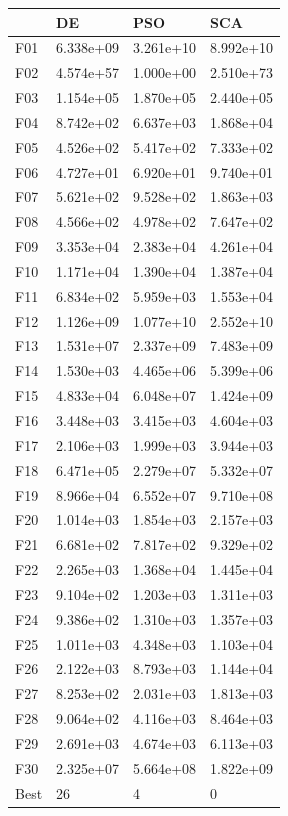 \begin{tabular}{llll}
\toprule
{} &         DE &        PSO &        SCA \\
\midrule
F01  &  6.338e+09 &  3.261e+10 &  8.992e+10 \\
F02  &  4.574e+57 &  1.000e+00 &  2.510e+73 \\
F03  &  1.154e+05 &  1.870e+05 &  2.440e+05 \\
F04  &  8.742e+02 &  6.637e+03 &  1.868e+04 \\
F05  &  4.526e+02 &  5.417e+02 &  7.333e+02 \\
F06  &  4.727e+01 &  6.920e+01 &  9.740e+01 \\
F07  &  5.621e+02 &  9.528e+02 &  1.863e+03 \\
F08  &  4.566e+02 &  4.978e+02 &  7.647e+02 \\
F09  &  3.353e+04 &  2.383e+04 &  4.261e+04 \\
F10  &  1.171e+04 &  1.390e+04 &  1.387e+04 \\
F11  &  6.834e+02 &  5.959e+03 &  1.553e+04 \\
F12  &  1.126e+09 &  1.077e+10 &  2.552e+10 \\
F13  &  1.531e+07 &  2.337e+09 &  7.483e+09 \\
F14  &  1.530e+03 &  4.465e+06 &  5.399e+06 \\
F15  &  4.833e+04 &  6.048e+07 &  1.424e+09 \\
F16  &  3.448e+03 &  3.415e+03 &  4.604e+03 \\
F17  &  2.106e+03 &  1.999e+03 &  3.944e+03 \\
F18  &  6.471e+05 &  2.279e+07 &  5.332e+07 \\
F19  &  8.966e+04 &  6.552e+07 &  9.710e+08 \\
F20  &  1.014e+03 &  1.854e+03 &  2.157e+03 \\
F21  &  6.681e+02 &  7.817e+02 &  9.329e+02 \\
F22  &  2.265e+03 &  1.368e+04 &  1.445e+04 \\
F23  &  9.104e+02 &  1.203e+03 &  1.311e+03 \\
F24  &  9.386e+02 &  1.310e+03 &  1.357e+03 \\
F25  &  1.011e+03 &  4.348e+03 &  1.103e+04 \\
F26  &  2.122e+03 &  8.793e+03 &  1.144e+04 \\
F27  &  8.253e+02 &  2.031e+03 &  1.813e+03 \\
F28  &  9.064e+02 &  4.116e+03 &  8.464e+03 \\
F29  &  2.691e+03 &  4.674e+03 &  6.113e+03 \\
F30  &  2.325e+07 &  5.664e+08 &  1.822e+09 \\
Best &         26 &          4 &          0 \\
\bottomrule
\end{tabular}

